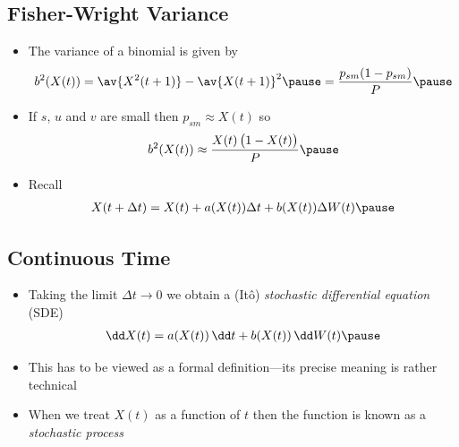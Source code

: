 
\begin{slide}
\section[-1]{Fisher-Wright Variance}

\begin{PauseHighLight}
  \begin{itemize}
  \item The variance of a binomial is given by
    \begin{align*}
      b^2(X(t)) = \av{X^2(t+1)} - \av{X(t+1)}^2 \pause
      = \frac{p_{sm}(1-p_{sm})}{P}\pause
    \end{align*}
  \item If $s$, $u$ and $v$ are small then $p_{sm}\approx X(t)$ so
    \begin{align*}
      b^2(X(t)) \approx \frac{X(t)\left(\strut 1-X(t)\right)}{P}\pause
    \end{align*}
  \item Recall
        \begin{align*}
      X(t+\Delta t) = X(t) + a(X(t)) \Delta t + b(X(t)) \Delta W(t)\pause
    \end{align*}
  \end{itemize}
\end{PauseHighLight}

\end{slide}



\begin{slide}
\section{Continuous Time}

\begin{PauseHighLight}
  \begin{itemize}
  \item Taking the limit $\Delta t\rightarrow 0$ we obtain a (It\^o)
    \textit{stochastic differential equation} (SDE)
    \begin{align*}
      \dd X(t) = a(X(t))\, \dd t + b(X(t))\, \dd W(t)\pause
    \end{align*}
  \item This has to be viewed as a formal definition---its precise
    meaning is rather technical\pause
  \item When we treat $X(t)$ as a function of $t$ then the function is
    known as a \emph{stochastic process}\pause
  \end{itemize}
\end{PauseHighLight}

\end{slide}

